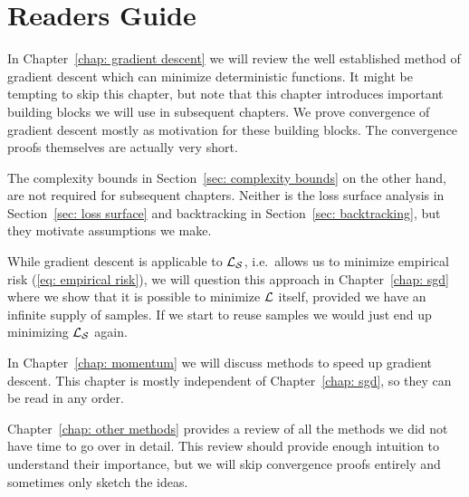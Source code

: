 \section{Readers Guide}

In Chapter~\ref{chap: gradient descent} we will review the well
established method of gradient descent which can minimize deterministic
functions. It might be tempting to skip this chapter, but note that this chapter 
introduces important building blocks we will use in subsequent chapters. We
prove convergence of gradient descent mostly as motivation for these building blocks.
The convergence proofs themselves are actually very short.

The complexity bounds in Section~\ref{sec: complexity bounds} on the other hand,
are not required for subsequent chapters. Neither is the loss surface analysis
in Section~\ref{sec: loss surface} and backtracking in Section~\ref{sec:
backtracking}, but they motivate assumptions we make.

While gradient descent is applicable to \(\mathcal{L}_{\mathcal{S}}\), i.e.\ allows us
to minimize empirical risk (\ref{eq: empirical risk}), we will question this
approach in Chapter~\ref{chap: sgd} where we show that it is possible to
minimize \(\mathcal{L}\) itself, provided we have an infinite supply of samples. If we
start to reuse samples we would just end up minimizing \(\mathcal{L}_{\mathcal{S}}\) again.

In Chapter~\ref{chap: momentum} we will discuss methods to speed up
gradient descent. This chapter is mostly independent of Chapter~\ref{chap: sgd},
so they can be read in any order.

Chapter~\ref{chap: other methods} provides a review of all the methods we did
not have time to go over in detail. This review should provide enough intuition
to understand their importance, but we will skip convergence proofs entirely
and sometimes only sketch the ideas.



\endinput
